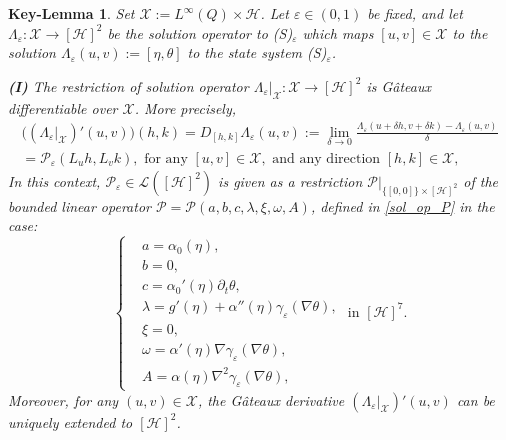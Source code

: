 \documentclass{sinst}
\numberwithin{equation}{section}
\theoremstyle{plain}
\newtheorem{keylem}{Key-Lemma}
\theoremstyle{definition}
\def\sH{\mathscr{H}}
\def\sL{\mathscr{L}}
\def\sP{\mathscr{P}}
\def\sX{\mathscr{X}}
\begin{document}
\begin{keylem} \label{lem:Gateaux}
  Set $\sX := L^\infty(Q) \times \sH$. Let $\varepsilon \in (0,1)$ be fixed, and let $\Lambda_\varepsilon:\sX \longrightarrow [\sH]^2$ be the solution operator to (S)$_\varepsilon$ which maps $[u,v] \in \sX$ to the solution $\Lambda_\varepsilon(u,v) := [\eta, \theta]$ to the state system (S)$_\varepsilon$. 
  
  \smallskip
  \noindent
  \textbf{(I)} The restriction of solution operator $\Lambda_\varepsilon|_\sX:\sX \longrightarrow [\sH]^2$ is G\^{a}teaux differentiable over $\sX$. More precisely,
  \begin{gather}
    \bigl( (\Lambda_\varepsilon|_\sX)'(u,v) \bigr)(h,k) = D_{[h,k]} \Lambda_\varepsilon(u,v) := \lim_{\delta \to 0} \frac{\Lambda_\varepsilon(u + \delta h, v + \delta k) - \Lambda_\varepsilon(u,v)}{\delta}
    \\
    = \sP_\varepsilon(L_u h,L_v k), \mbox{ for any } [u,v] \in \sX, \mbox{ and any direction } [h,k] \in \sX,
  \end{gather}
  In this context, $\sP_\varepsilon \in \sL([\sH]^2)$ is given as a restriction $\sP|_{\{[0,0]\} \times [\sH]^2}$ of the bounded linear operator $\sP = \sP(a,b,c,\lambda,\xi,\omega,A)$, defined in \eqref{sol_op_P} in the case:
  \begin{equation}
    \left\{ \begin{aligned}
      &a = \alpha_0(\eta),
      \\
      &b = 0,
      \\
      &c = \alpha_0'(\eta) \partial_t \theta,
      \\
      &\lambda = g'(\eta) + \alpha''(\eta) \gamma_\varepsilon(\nabla \theta),
      \\
      &\xi = 0,
      \\
      &\omega = \alpha'(\eta) \nabla \gamma_\varepsilon(\nabla \theta),
      \\
      &A = \alpha(\eta) \nabla^2 \gamma_\varepsilon(\nabla \theta),
    \end{aligned} \right. \mbox{ in } [\sH]^7.
  \end{equation}
  Moreover, for any $(u,v) \in \sX$, the G\^{a}teaux derivative $(\Lambda_\varepsilon|_\sX)'(u,v)$ can be uniquely extended to $[\sH]^2$.
  

\end{keylem}
\end{document}
